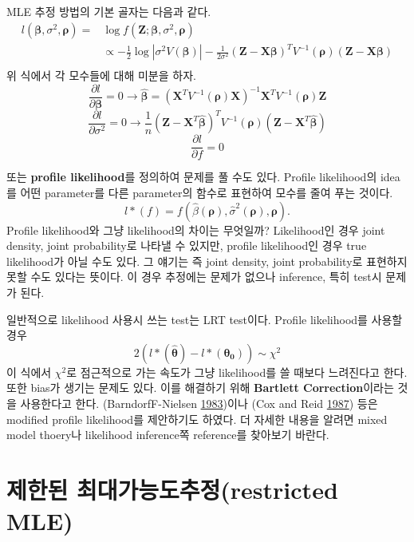 \documentclass[b5paper,]{book}
\theoremstyle{definition}
\theoremstyle{definition}
\theoremstyle{definition}
\theoremstyle{remark}
\begin{document}
MLE 추정 방법의 기본 골자는 다음과 같다. \[
\begin{aligned}
l(\boldsymbol{\beta},\sigma^{2}, \boldsymbol{\rho})=&\log f(\mathbf{Z};\boldsymbol{\beta},\sigma^{2},\boldsymbol{\rho})\\
&\varpropto -\frac{1}{2}\log |\sigma^{2}V(\boldsymbol{\beta})| -\frac{1}{2\sigma^{2}}(\mathbf{Z}-\mathbf{X}\boldsymbol{\beta})^{T}V^{-1}(\boldsymbol{\rho})(\mathbf{Z}-\mathbf{X}\boldsymbol{\beta})\\
\end{aligned}
\] 위 식에서 각 모수들에 대해 미분을 하자.
\[\frac{\partial l}{\partial \boldsymbol{\beta}}=0 \rightarrow \hat{\boldsymbol{\beta}}=(\mathbf{X}^{T}V^{-1}(\boldsymbol{\rho})\mathbf{X})^{-1}\mathbf{X}^{T}V^{-1}(\boldsymbol{\rho})\mathbf{Z}\]
\[\frac{\partial l}{\partial \sigma^{2}}=0 \rightarrow \frac{1}{n}(\mathbf{Z}-\mathbf{X}^{T}\hat{\boldsymbol{\beta}})^{T}V^{-1}(\boldsymbol{\rho})(\mathbf{Z}-\mathbf{X}^{T}\hat{\boldsymbol{\beta}})\]
\[\frac{\partial l}{\partial f}=0\]

또는 \textbf{profile likelihood}를 정의하여 문제를 풀 수도 있다. Profile
likelihood의 idea를 어떤 parameter를 다른 parameter의 함수로 표현하여
모수를 줄여 푸는 것이다.
\[l*(f)=f(\hat{\beta}(\boldsymbol{\rho}), \hat{\sigma}^{2}(\boldsymbol{\rho}),\boldsymbol{\rho}).\]
Profile likelihood와 그냥 likelihood의 차이는 무엇일까? Likelihood인
경우 joint density, joint probability로 나타낼 수 있지만, profile
likelihood인 경우 true likelihood가 아닐 수도 있다. 그 얘기는 즉 joint
density, joint probability로 표현하지 못할 수도 있다는 뜻이다. 이 경우
추정에는 문제가 없으나 inference, 특히 test시 문제가 된다.

일반적으로 likelihood 사용시 쓰는 test는 LRT test이다. Profile
likelihood를 사용할 경우
\[2(l*(\hat{\boldsymbol{\theta}})-l*(\boldsymbol{\theta_{0}})) \sim \chi^{2}\]
이 식에서 \(\chi^{2}\)로 점근적으로 가는 속도가 그냥 likelihood를 쓸
때보다 느려진다고 한다. 또한 bias가 생기는 문제도 있다. 이를 해결하기
위해 \textbf{Bartlett Correction}이라는 것을 사용한다고 한다.
(BarndorfF-Nielsen
\protect\hyperlink{ref-BarndorfF-Nielsen1983}{1983})이나 (Cox and Reid
\protect\hyperlink{ref-Cox1987}{1987}) 등은 modified profile
likelihood를 제안하기도 하였다. 더 자세한 내용을 알려면 mixed model
thoery나 likelihood inference쪽 reference를 찾아보기 바란다.

\section{제한된 최대가능도추정(restricted MLE)}\label{-restricted-mle}
\end{document}
